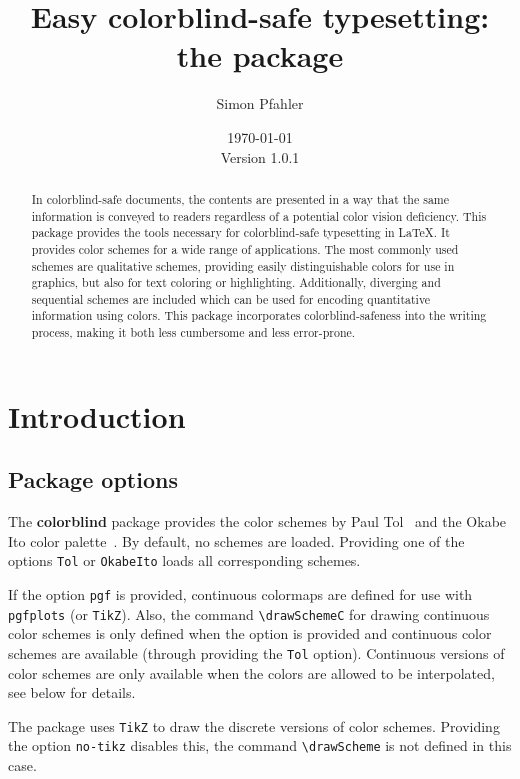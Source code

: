 \documentclass{scrartcl}
\title{Easy colorblind-safe typesetting:\\ the \colorblind package}
\author{Simon Pfahler}
\date{\today\\Version 1.0.1}
\newcommand\colorblind{\textbf{colorblind} }
\newcommand\marg[1]{\leavevmode\marginpar{\raggedleft #1}}
\begin{document}
\maketitle

\begin{abstract}
    In colorblind-safe documents, the contents are presented in a way that the same information is conveyed to readers regardless of a potential color vision deficiency.
    This package provides the tools necessary for colorblind-safe typesetting in \LaTeX.
    It provides color schemes for a wide range of applications.
    The most commonly used schemes are qualitative schemes, providing easily distinguishable colors for use in graphics, but also for text coloring or highlighting.
    Additionally, diverging and sequential schemes are included which can be used for encoding quantitative information using colors.
    This package incorporates colorblind-safeness into the writing process, making it both less cumbersome and less error-prone.
\end{abstract}

\tableofcontents
\clearpage

\section{Introduction}
\subsection{Package options}
\cprotect\marg{\verb!Tol!\\\verb!OkabeIto!}%
The \colorblind package provides the color schemes by Paul Tol~\cite{Tol} and the Okabe Ito color palette~\cite{Ichihara_2008}.
By default, no schemes are loaded.
Providing one of the options \verb!Tol! or \verb!OkabeIto! loads all corresponding schemes.

\cprotect\marg{\verb!pgf!}%
If the option \verb!pgf! is provided, continuous colormaps are defined for use with \verb!pgfplots! (or \verb!TikZ!).
Also, the command \verb!\drawSchemeC! for drawing continuous color schemes is only defined when the option is provided and continuous color schemes are available (through providing the \verb!Tol! option).
Continuous versions of color schemes are only available when the colors are allowed to be interpolated, see below for details.

\cprotect\marg{\verb!no-tikz!}%
The package uses \verb!TikZ! to draw the discrete versions of color schemes.
Providing the option \verb!no-tikz! disables this, the command \verb!\drawScheme! is not defined in this case.
\end{document}
